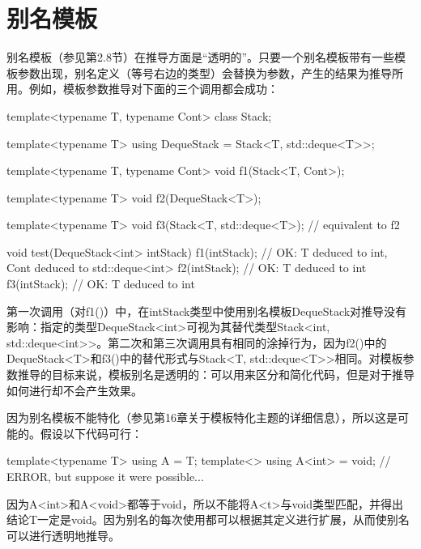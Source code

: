 \section{别名模板}
别名模板（参见第2.8节）在推导方面是“透明的”。只要一个别名模板带有一些模板参数出现，别名定义（等号右边的类型）会替换为参数，产生的结果为推导所用。例如，模板参数推导对下面的三个调用都会成功：

\begin{cpp}
template<typename T, typename Cont>
class Stack;

template<typename T>
using DequeStack = Stack<T, std::deque<T>>;

template<typename T, typename Cont>
void f1(Stack<T, Cont>);

template<typename T>
void f2(DequeStack<T>);

template<typename T>
void f3(Stack<T, std::deque<T>); // equivalent to f2

void test(DequeStack<int> intStack)
{
	f1(intStack); // OK: T deduced to int, Cont deduced to std::deque<int>
	f2(intStack); // OK: T deduced to int
	f3(intStack); // OK: T deduced to int
}
\end{cpp}

第一次调用（对f1()）中，在intStack类型中使用别名模板DequeStack对推导没有影响：指定的类型DequeStack<int>可视为其替代类型Stack<int, std::deque<int>{}>。第二次和第三次调用具有相同的涂掉行为，因为f2()中的DequeStack<T>和f3()中的替代形式与Stack<T, std::deque<T>{}>相同。对模板参数推导的目标来说，模板别名是透明的：可以用来区分和简化代码，但是对于推导如何进行却不会产生效果。

因为别名模板不能特化（参见第16章关于模板特化主题的详细信息），所以这是可能的。假设以下代码可行：

\begin{cpp}
template<typename T> using A = T;
template<> using A<int> = void; // ERROR, but suppose it were possible...
\end{cpp}

因为A<int>和A<void>都等于void，所以不能将A<t>与void类型匹配，并得出结论T一定是void。因为别名的每次使用都可以根据其定义进行扩展，从而使别名可以进行透明地推导。

























